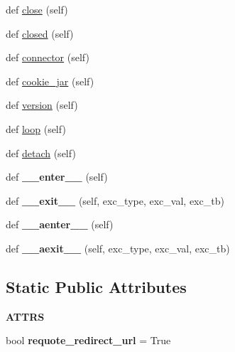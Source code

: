 \begin{DoxyCompactItemize}
def \hyperlink{classaiohttp_1_1client_1_1_client_session_af9d3ae9648b4e205f7d689285c6640e1}{close} (self)
\item 
def \hyperlink{classaiohttp_1_1client_1_1_client_session_a8c32c38a78683da779a4ae431ad0f924}{closed} (self)
\item 
def \hyperlink{classaiohttp_1_1client_1_1_client_session_a41272d6a492699baf7aefb308a9fb7ea}{connector} (self)
\item 
def \hyperlink{classaiohttp_1_1client_1_1_client_session_aa9bee3ce9c62ca05d848f03329315618}{cookie\+\_\+jar} (self)
\item 
def \hyperlink{classaiohttp_1_1client_1_1_client_session_a5f6ab7a25c8e88005e78477f0f1b572b}{version} (self)
\item 
def \hyperlink{classaiohttp_1_1client_1_1_client_session_addc1e7d257a7abfd78eef10b9c7f4fb6}{loop} (self)
\item 
def \hyperlink{classaiohttp_1_1client_1_1_client_session_ac7cf0650d79653b4b40e0b2a48527729}{detach} (self)
\item 
\mbox{\label{classaiohttp_1_1client_1_1_client_session_a32c259eb171167c99b16dcd495bea0b3}} 
def {\bfseries \+\_\+\+\_\+enter\+\_\+\+\_\+} (self)
\item 
\mbox{\label{classaiohttp_1_1client_1_1_client_session_a9f95a46c73cb2b3947ba51ad5aefe403}} 
def {\bfseries \+\_\+\+\_\+exit\+\_\+\+\_\+} (self, exc\+\_\+type, exc\+\_\+val, exc\+\_\+tb)
\item 
\mbox{\label{classaiohttp_1_1client_1_1_client_session_af5855a535c9aa64d3b40292afab5f5e9}} 
def {\bfseries \+\_\+\+\_\+aenter\+\_\+\+\_\+} (self)
\item 
\mbox{\label{classaiohttp_1_1client_1_1_client_session_a82710cf4c0f2b9c608bf4ca4d9e68c27}} 
def {\bfseries \+\_\+\+\_\+aexit\+\_\+\+\_\+} (self, exc\+\_\+type, exc\+\_\+val, exc\+\_\+tb)
\end{DoxyCompactItemize}
\subsection*{Static Public Attributes}
\begin{DoxyCompactItemize}
\item 
{\bfseries A\+T\+T\+RS}
\item 
\mbox{\label{classaiohttp_1_1client_1_1_client_session_ac5e4231aeddba84530ed725819208204}} 
bool {\bfseries requote\+\_\+redirect\+\_\+url} = True
\end{DoxyCompactItemize}


